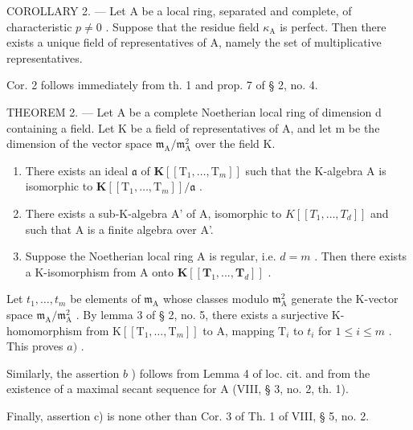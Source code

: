 COROLLARY 2. --- Let A be a local ring, separated and complete, of characteristic \(p \neq 0\) . Suppose that the residue field \(\kappa_{\mathrm{A}}\) is perfect. Then there exists a unique field of representatives of A, namely the set of multiplicative representatives.

Cor. 2 follows immediately from th. 1 and prop. 7 of § 2, no. 4.

THEOREM 2. --- Let A be a complete Noetherian local ring of dimension d containing a field. Let K be a field of representatives of A, and let m be the dimension of the vector space \(\mathfrak{m}_{\mathrm{A}} / \mathfrak{m}_{\mathrm{A}}^{2}\) over the field K.

\begin{enumerate}
\def\labelenumi{\alph{enumi})}
\item
  There exists an ideal \(\mathfrak{a}\) of \(\mathbf{K}[[\mathrm{T}_1,\dots,\mathrm{T}_m]]\) such that the K-algebra A is isomorphic to \(\mathbf{K}[[\mathrm{T}_1,\dots,\mathrm{T}_m]] / \mathfrak{a}\) .
\item
  There exists a sub-K-algebra A' of A, isomorphic to \(K[[T_{1}, \ldots, T_{d}]]\) and such that A is a finite algebra over A'.
\item
  Suppose the Noetherian local ring A is regular, i.e. \(d = m\) . Then there exists a K-isomorphism from A onto \(\mathbf{K}[[\mathbf{T}_1, ..., \mathbf{T}_d]]\) .
\end{enumerate}

Let \(t_{1},\ldots,t_{m}\) be elements of \(\mathfrak{m}_{\mathrm{A}}\) whose classes modulo \(\mathfrak{m}_{\mathrm{A}}^{2}\) generate the K-vector space \(\mathfrak{m}_{\mathrm{A}}/\mathfrak{m}_{\mathrm{A}}^{2}\) . By lemma 3 of § 2, no. 5, there exists a surjective K-homomorphism from \(\mathrm{K}[[\mathrm{T}_{1},\ldots,\mathrm{T}_{m}]]\) to A, mapping \(\mathrm{T}_{i}\) to \(t_{i}\) for \(1\leqslant i\leqslant m\) . This proves \(a)\) .

Similarly, the assertion \(b\) ) follows from Lemma 4 of loc. cit. and from the existence of a maximal secant sequence for A (VIII, § 3, no. 2, th. 1).

Finally, assertion c) is none other than Cor. 3 of Th. 1 of VIII, § 5, no. 2.

